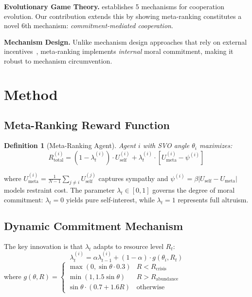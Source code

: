\documentclass{article}
\newtheorem{definition}{Definition}
\begin{document}
\textbf{Evolutionary Game Theory.}
\citet{nowak2006evolutionary} establishes 5 mechanisms for cooperation evolution.
Our contribution extends this by showing meta-ranking constitutes a novel 6th mechanism: \textit{commitment-mediated cooperation}.

\textbf{Mechanism Design.}
Unlike mechanism design approaches that rely on external incentives~\citep{hurwicz1973design}, meta-ranking implements \textit{internal} moral commitment, making it robust to mechanism circumvention.

\section{Method}

\subsection{Meta-Ranking Reward Function}

\begin{definition}[Meta-Ranking Agent]
Agent $i$ with SVO angle $\theta_i$ maximizes:
\begin{equation}
R_{\text{total}}^{(i)} = (1 - \lambda_t^{(i)}) \cdot U_{\text{self}}^{(i)}
  + \lambda_t^{(i)} \cdot \left[ U_{\text{meta}}^{(i)} - \psi^{(i)} \right]
\label{eq:reward}
\end{equation}
\end{definition}

\noindent where $U_{\text{meta}}^{(i)} = \frac{1}{N-1}\sum_{j \neq i} U_{\text{self}}^{(j)}$ captures sympathy and $\psi^{(i)} = \beta |U_{\text{self}} - U_{\text{meta}}|$ models restraint cost. The parameter $\lambda_t \in [0,1]$ governs the degree of moral commitment: $\lambda_t = 0$ yields pure self-interest, while $\lambda_t = 1$ represents full altruism.

\subsection{Dynamic Commitment Mechanism}

The key innovation is that $\lambda_t$ adapts to resource level $R_t$:
\begin{equation}
\lambda_t^{(i)} = \alpha \lambda_{t-1}^{(i)} + (1-\alpha) \cdot g(\theta_i, R_t)
\label{eq:lambda}
\end{equation}
where $g(\theta, R) = \begin{cases}
\max(0, \sin\theta \cdot 0.3) & R < R_{\text{crisis}} \\
\min(1, 1.5\sin\theta) & R > R_{\text{abundance}} \\
\sin\theta \cdot (0.7 + 1.6R) & \text{otherwise}
\end{cases}$
\end{document}
